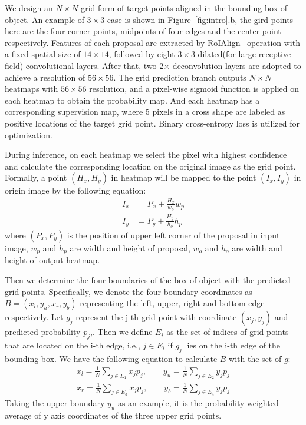 \documentclass[10pt,twocolumn,letterpaper]{article}
\begin{document}
We design an $N \times N$ grid form of target points aligned in the bounding box of object. An example of $3 \times 3$ case is shown in Figure~\ref{fig:intro}.b, the gird points here are the four corner points, midpoints of four edges and the center point respectively. Features of each proposal are extracted by RoIAlign~\cite{he2017mask} operation with a fixed spatial size of $14 \times 14$, followed by eight $3 \times 3$ dilated(for large receptive field) convolutional layers. After that, two 2$\times$ deconvolution layers are adopted to achieve a resolution of $56 \times 56$.
The grid prediction branch outputs $N \times N$ heatmaps with $56 \times 56$ resolution, and a pixel-wise sigmoid function is applied on each heatmap to obtain the probability map. And each heatmap has a corresponding supervision map, where 5 pixels in a cross shape are labeled as positive locations of the target grid point. Binary cross-entropy loss is utilized for optimization.

During inference, on each heatmap we select the pixel with highest confidence and calculate the corresponding location on the original image as the grid point. Formally, a point $(H_x, H_y)$ in heatmap will be mapped to the point $(I_x, I_y)$ in origin image by the following equation:
\begin{equation}
\begin{aligned}
\label{eq:mapping}
I_{x} &= P_{x}+\frac{H_x}{w_o}{w_p} \\ 
I_{y} &= P_{y}+\frac{H_y}{h_o}{h_p}
\end{aligned}
\end{equation}
where $(P_{x},P_{y})$ is the position of upper left corner of the proposal in input image, $w_p$ and $h_p$ are width and height of proposal, $w_o$ and $h_o$ are width and height of output heatmap. 

Then we determine the four boundaries of the box of object with the predicted grid points. Specifically, we denote the four boundary coordinates as $B = (x_l, y_u, x_r, y_b)$ representing the left, upper, right and bottom edge respectively. Let $g_j $ represent the j-th grid point with coordinate $(x_j, y_j)$ and predicted probability $p_j$,. Then we define $E_i$ as the set of indices of grid points that are located on the i-th edge, i.e., $j \in E_i$ if $g_j$ lies on the i-th edge of the bounding box.
We have the following equation to calculate $B$ with the set of $g$: 
\begin{equation}
\label{eq:boundary}
\begin{aligned}
x_l = \frac{1}{N}\sum_{j \in E_1} x_j p_j,
\qquad y_u = \frac{1}{N}\sum_{j \in E_2} y_j p_j \\
x_r = \frac{1}{N}\sum_{j \in E_3} x_j p_j,
\qquad y_b = \frac{1}{N}\sum_{j \in E_4} y_j p_j
\end{aligned}
\end{equation}
Taking the upper boundary $y_u$ as an example, it is the probability weighted average of y axis coordinates of the three upper grid points.
\end{document}
